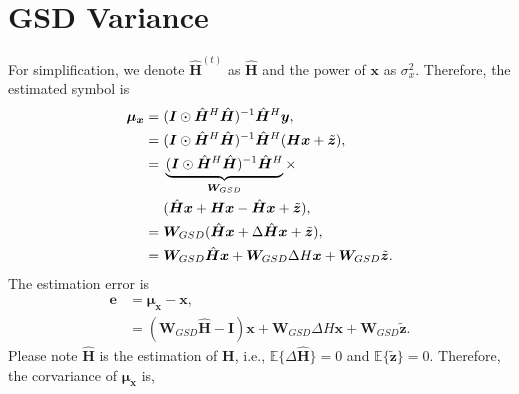 \documentclass[journal]{IEEEtran}
\begin{document}
\section{GSD Variance} \label{app:GSD}
For simplification, we denote $\hat{\bm H}^{(t)}$ as $ \hat{\bm H}$ and the power of $\bm x$ as $\sigma_x^2$. Therefore, the estimated symbol is
\begin{equation}
\begin{split}
\boldsymbol{\mu}_{\boldsymbol{x}} = \hspace{0.3em}& (\boldsymbol{I}\odot\hat{\boldsymbol{H}}^H \hat{\boldsymbol{H}})^{-1}\hat{\boldsymbol{H}}^H\boldsymbol{y}, \\
= \hspace{0.3em}& (\boldsymbol{I}\odot\hat{\boldsymbol{H}}^H \hat{\boldsymbol{H}})^{-1}\hat{\boldsymbol{H}}^H(\boldsymbol{H} \boldsymbol{x} + \tilde{\boldsymbol{z}}), \\
= \hspace{0.3em}& \underbrace{(\boldsymbol{I}\odot\hat{\boldsymbol{H}}^H \hat{\boldsymbol{H}})^{-1}\hat{\boldsymbol{H}}^H}_{{\boldsymbol{W}}_{GSD}} \times \\
& (\hat{\boldsymbol{H}} \boldsymbol{x} + \boldsymbol{H} \boldsymbol{x} - \hat{\boldsymbol{H}} \boldsymbol{x} + \tilde{\boldsymbol{z}}), \\
= \hspace{0.3em} & {\boldsymbol{W}}_{GSD} (\hat{\boldsymbol{H}} \boldsymbol{x} + \Delta\hat{\boldsymbol{H}} \boldsymbol{x} + \tilde{\boldsymbol{z}}), \\
= \hspace{0.3em} & {\boldsymbol{W}}_{GSD}\hat{\boldsymbol{H}} \boldsymbol{x} + {\boldsymbol{W}}_{GSD}\Delta H\boldsymbol{x} +  {\boldsymbol{W}}_{GSD}\tilde{\boldsymbol{z}}.
\end{split}
\end{equation}
The estimation error is
\begin{equation}
\begin{split}
\bm e &= \bm {\mu}_{\bm x} - \bm x, \\
&= ({\bm W}_{GSD}\hat{\bm H} - \bm I) \bm x + {\bm W}_{GSD}\Delta H\bm x + {\bm W}_{GSD}\tilde{\bm z}.
\end{split}
\end{equation}
Please note $\hat{\bm H}$ is the estimation of $\bm H$, i.e., $\mathbb{E}\{\Delta\hat{\bm H} \}=0$ and $\mathbb{E}\{ \tilde{\bm z}\}=0$. Therefore, the corvariance of $\bm {\mu}_{\bm x}$ is,
\end{document}
